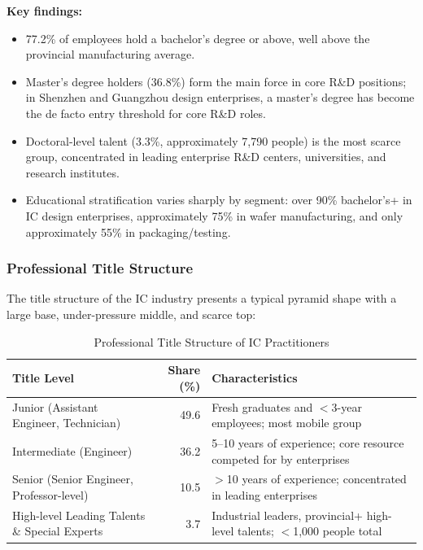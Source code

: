 \documentclass[12pt,a4paper]{article}
\newcommand{\tableHeaderRow}{\rowcolor{tealPrimary}\color{white}}
\newcommand{\tableOddRow}{\rowcolor{mintBG}}
\newcommand{\tableEvenRow}{\rowcolor{white}}
\begin{document}
\textbf{Key findings:}
\begin{itemize}
    \item 77.2\% of employees hold a bachelor's degree or above, well above
          the provincial manufacturing average.
    \item Master's degree holders (36.8\%) form the main force in core R\&D
          positions; in Shenzhen and Guangzhou design enterprises, a master's
          degree has become the de facto entry threshold for core R\&D roles.
    \item Doctoral-level talent (3.3\%, approximately 7,790 people) is the most
          scarce group, concentrated in leading enterprise R\&D centers,
          universities, and research institutes.
    \item Educational stratification varies sharply by segment: over 90\%
          bachelor's+ in IC design enterprises, approximately 75\% in wafer
          manufacturing, and only approximately 55\% in packaging/testing.
\end{itemize}

\subsubsection{Professional Title Structure}

The title structure of the IC industry presents a typical pyramid shape with
a large base, under-pressure middle, and scarce top:

\begin{table}[H]
\centering
\caption{Professional Title Structure of IC Practitioners}
\label{tab:titles}
\begin{tabular}{p{4.5cm}rp{7.5cm}}
\toprule
\tableHeaderRow
\textbf{Title Level} & \textbf{Share (\%)} & \textbf{Characteristics} \\
\midrule
\tableOddRow  Junior (Assistant Engineer, Technician) & 49.6 & Fresh graduates and $<$3-year employees; most mobile group \\
\tableEvenRow Intermediate (Engineer) & 36.2 & 5--10 years of experience; core resource competed for by enterprises \\
\tableOddRow  Senior (Senior Engineer, Professor-level) & 10.5 & $>$10 years of experience; concentrated in leading enterprises \\
\tableEvenRow High-level Leading Talents \& Special Experts & 3.7 & Industrial leaders, provincial+ high-level talents; $<$1,000 people total \\
\bottomrule
\end{tabular}
\end{table}
\end{document}
